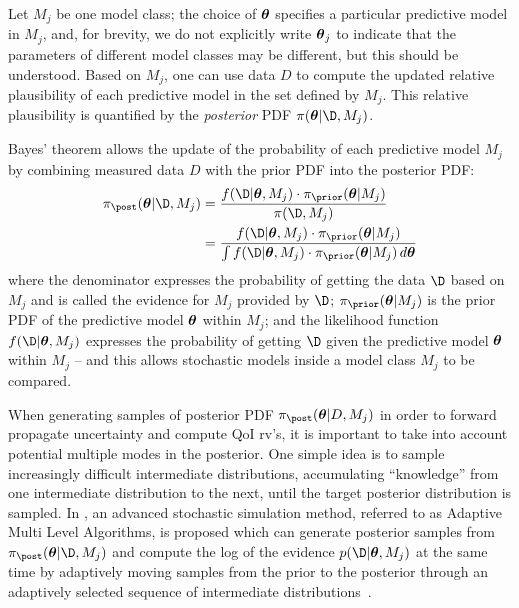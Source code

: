 Let $M_j$ be one model class; the choice of $\mbox{\boldmath$ \theta $} $ specifies a particular predictive model in $M_j$, and, for brevity, we do not explicitly write $\mbox{\boldmath$ \theta $}_j $ to indicate that the parameters of different model classes may be different, but this should be understood.  Based on $M_j$, one can use data $D$ to compute
the updated relative plausibility of each predictive model in the set
defined by $M_j$.  This relative plausibility is quantified by the
\textit{posterior} PDF $\pi(\boldsymbol{\theta}|\D,M_j)$.


Bayes’ theorem allows the update of the probability of each predictive model $M_j$ by combining measured data $D$ with the prior PDF into the posterior PDF:
\begin{equation}
\begin{split}
\pi_\post (\bv{\theta}|\D, M_j) &= \dfrac{f(\D|\bv{\theta}, M_j) \cdot \pi_\prior (\bv{\theta} | M_j)}{\pi(\D, M_j)} 
\\
&= \dfrac{f(\D|\bv{\theta}, M_j) \cdot \pi_\prior (\bv{\theta} | M_j)}{\int f(\D|\bv{\theta}, M_j) \cdot \pi_\prior (\bv{\theta} | M_j)\, d\bv{\theta}} 
\end{split}
\end{equation}
where the denominator expresses the probability of getting the data $\D$ based on $M_j$ and is called the evidence for
$M_j$ provided by $\D$; $\pi_\prior (\bv{\theta} | M_j)$ is the prior PDF of the predictive model $\mbox{\boldmath$ \theta $}$ within $M_j$; and the likelihood function $f(\D|\bv{\theta}, M_j)$ expresses the probability of getting $\D$ given the predictive model $\mbox{\boldmath$ \theta $}$ within $M_j$ -- and this allows stochastic models inside a model class $M_j$ to be compared. 







When generating samples of posterior PDF $\pi_\post(\bv{\theta}|D,M_j) $ in order to forward propagate uncertainty and compute QoI rv’s, it is important to take into account potential multiple modes in the posterior. One simple idea is to sample increasingly difficult intermediate distributions, accumulating ``knowledge'' from one intermediate distribution to the next, until the target posterior distribution is sampled.  In
\cite{CheungPrudencio2012}, an advanced stochastic simulation
method, referred to as Adaptive Multi Level Algorithms, is proposed
which can generate posterior samples from $\pi_\post (\bv{\theta}|\D, M_j)$
and compute the log of the evidence
$p(\D | \boldsymbol{\theta},M_j)$ at the same time by adaptively moving
samples from the prior to the posterior through an adaptively selected
sequence of intermediate distributions~\cite{ChOlPr10}.  

